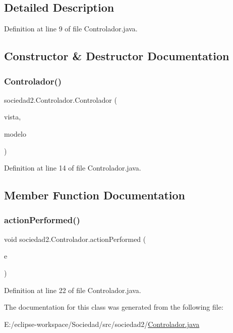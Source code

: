 \subsection{Detailed Description}


Definition at line 9 of file Controlador.\+java.



\subsection{Constructor \& Destructor Documentation}
\mbox{\label{classsociedad2_1_1_controlador_a7601ad3194e4adbe6f760df3ed36c607}} 
\subsubsection{\texorpdfstring{Controlador()}{Controlador()}}
{\footnotesize\ttfamily sociedad2.\+Controlador.\+Controlador (\begin{DoxyParamCaption}\item[{\mbox{\hyperlink{classsociedad2_1_1_vista}{Vista}}}]{vista,  }\item[{\mbox{\hyperlink{classsociedad2_1_1_modelo}{Modelo}}}]{modelo }\end{DoxyParamCaption})}



Definition at line 14 of file Controlador.\+java.



\subsection{Member Function Documentation}
\mbox{\label{classsociedad2_1_1_controlador_a87860be9c7aff3e6d88d4e88f66e6f51}} 
\subsubsection{\texorpdfstring{action\+Performed()}{actionPerformed()}}
{\footnotesize\ttfamily void sociedad2.\+Controlador.\+action\+Performed (\begin{DoxyParamCaption}\item[{Action\+Event}]{e }\end{DoxyParamCaption})}



Definition at line 22 of file Controlador.\+java.



The documentation for this class was generated from the following file\+:\begin{DoxyCompactItemize}
\item 
E\+:/eclipse-\/workspace/\+Sociedad/src/sociedad2/\mbox{\hyperlink{_controlador_8java}{Controlador.\+java}}\end{DoxyCompactItemize}

